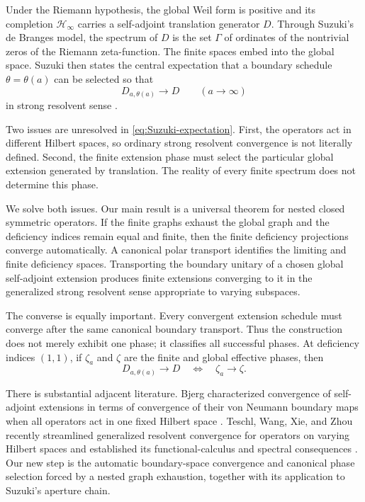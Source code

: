 \documentclass[11pt]{article}
\theoremstyle{remark}
\newcommand{\Hh}{\mathcal H}
\begin{document}
Under the Riemann hypothesis, the global Weil form is positive and its completion $\Hh_\infty$
carries a self-adjoint translation generator $D$.  Through Suzuki's de Branges model, the spectrum
of $D$ is the set $\Gamma$ of ordinates of the nontrivial zeros of the Riemann zeta-function.  The
finite spaces embed into the global space.  Suzuki then states the central expectation that a
boundary schedule $\theta=\theta(a)$ can be selected so that
\begin{equation}\label{eq:Suzuki-expectation}
  D_{a,\theta(a)}\longrightarrow D
  \qquad (a\to\infty)
\end{equation}
in strong resolvent sense \cite[Sections 7.5--7.6]{Suzuki2026}.

Two issues are unresolved in \eqref{eq:Suzuki-expectation}.  First, the operators act in different
Hilbert spaces, so ordinary strong resolvent convergence is not literally defined.  Second, the
finite extension phase must select the particular global extension generated by translation.  The
reality of every finite spectrum does not determine this phase.

We solve both issues.  Our main result is a universal theorem for nested closed symmetric
operators.  If the finite graphs exhaust the global graph and the deficiency indices remain equal
and finite, then the finite deficiency projections converge automatically.  A canonical polar
transport identifies the limiting and finite deficiency spaces.  Transporting the boundary
unitary of a chosen global self-adjoint extension produces finite extensions converging to it in
the generalized strong resolvent sense appropriate to varying subspaces.

The converse is equally important.  Every convergent extension schedule must converge after the
same canonical boundary transport.  Thus the construction does not merely exhibit one phase; it
classifies all successful phases.  At deficiency indices $(1,1)$, if $\zeta_a$ and $\zeta$ are the
finite and global effective phases, then
\begin{equation}\label{eq:scalar-lock-intro}
 D_{a,\theta(a)}\longrightarrow D
 \quad\Longleftrightarrow\quad
 \zeta_a\longrightarrow\zeta.
\end{equation}

There is substantial adjacent literature.  Bjerg characterized convergence of self-adjoint
extensions in terms of convergence of their von Neumann boundary maps when all operators act in
one fixed Hilbert space \cite{Bjerg2024}.  Teschl, Wang, Xie, and Zhou recently streamlined
generalized resolvent convergence for operators on varying Hilbert spaces and established its
functional-calculus and spectral consequences \cite{TeschlEtAl2026}.  Our new step is the automatic
boundary-space convergence and canonical phase selection forced by a nested graph exhaustion,
together with its application to Suzuki's aperture chain.
\end{document}
